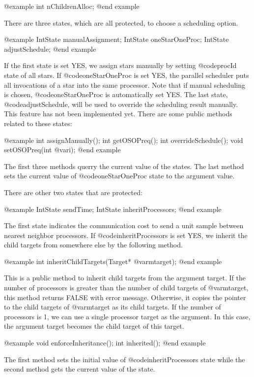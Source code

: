 @example
int nChildrenAlloc;
@end example

There are three states, which are all protected, to choose a scheduling option.

@example
IntState manualAssignment;
IntState oneStarOneProc;
IntState adjustSchedule;
@end example

If the first state is set YES, we assign stars manually by setting
@code{procId} state of all stars. If @code{oneStarOneProc} is set YES,
the parallel scheduler puts all invocations of a star into the same
processor. Note that if manual scheduling is chosen, @code{oneStarOneProc}
is automatically set YES. The last state, @code{adjustSchedule}, will be
used to override the scheduling result manually. This feature has not been
implemented yet. There are some public methods related to these states:

@example
int assignManually();
int getOSOPreq();
int overrideSchedule();
void setOSOPreq(int @var{i});
@end example

The first three methods querry the current value of the states. The last
method sets the current value of @code{oneStarOneProc} state to the
argument value.

There are other two states that are protected:

@example
IntState sendTime;
IntState inheritProcessors;
@end example

The first state indicates the communication cost to send a unit sample
between nearest neighbor processors. If @code{inheritProcessors} is set YES,
we inherit the child targets from somewhere else by the following method.

@example
int inheritChildTargets(Target* @var{mtarget});
@end example

This is a public method to inherit child targets from the argument target.
If the number of processors is greater than the number of child targets
of @var{mtarget}, this method returns FALSE with error message. Otherwise,
it copies the pointer to the child targets of @var{mtarget} as its child
targets. If the number of processors is 1, we can use a single processor
target as the argument. In this case, the argument target becomes the child
target of this target.

@example
void enforceInheritance();
int inherited();
@end example

The first method sets the initial value of @code{inheritProcessors} state
while the second method gets the current value of the state.

